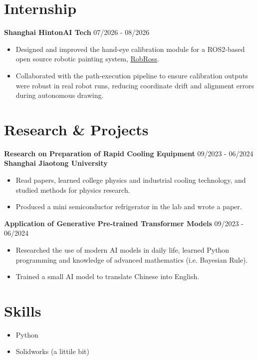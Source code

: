 \documentclass[a4paper,12pt]{article}
\begin{document}
\section{Internship}
\noindent \textbf{Shanghai HintonAI Tech} \hfill 07/2026 - 08/2026
\begin{itemize}
    \item Designed and improved the hand-eye calibration module for a ROS2-based open source robotic painting system, \href{https://github.com/dwarfguard/RobRoss}{RobRoss}.
    \item Collaborated with the path-execution pipeline to ensure calibration outputs were robust in real robot runs, reducing coordinate drift and alignment errors during autonomous drawing.
\end{itemize}


\section{Research \& Projects}
\noindent \textbf{Research on Preparation of Rapid Cooling Equipment} \hfill 09/2023 - 06/2024 \\ \textbf{Shanghai Jiaotong University}
\begin{itemize}
    \item Read papers, learned college physics and industrial cooling technology, and studied methods for physics research.
    \item Produced a mini semiconductor refrigerator in the lab and wrote a paper.
\end{itemize}
\noindent \textbf{Application of Generative Pre-trained Transformer Models} \hfill 09/2023 - 06/2024
\begin{itemize}
    \item Researched the use of modern AI models in daily life, learned Python programming and knowledge of advanced mathematics (i.e. Bayesian Rule).
    \item Trained a small AI model to translate Chinese into English.
\end{itemize}

\section{Skills}
\begin{itemize}
    \item Python
    \item Solidworks (a littile bit)
\end{itemize}
\end{document}
